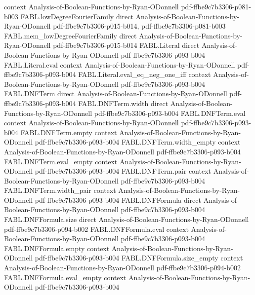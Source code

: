 \begin{theorem}
  {context}
  {Analysis-of-Boolean-Functions-by-Ryan-ODonnell}
  {pdf-ffbe9c7b3306-p081-b003}
\proofstep
  {FABL.lowDegreeFourierFamily}
  {direct}
  {Analysis-of-Boolean-Functions-by-Ryan-ODonnell}
  {pdf-ffbe9c7b3306-p015-b014,
    pdf-ffbe9c7b3306-p081-b003}
\proofstep
  {FABL.mem_lowDegreeFourierFamily}
  {direct}
  {Analysis-of-Boolean-Functions-by-Ryan-ODonnell}
  {pdf-ffbe9c7b3306-p015-b014}
\proofstep
  {FABL.Literal}
  {direct}
  {Analysis-of-Boolean-Functions-by-Ryan-ODonnell}
  {pdf-ffbe9c7b3306-p093-b004}
\proofstep
  {FABL.Literal.eval}
  {context}
  {Analysis-of-Boolean-Functions-by-Ryan-ODonnell}
  {pdf-ffbe9c7b3306-p093-b004}
\proofstep
  {FABL.Literal.eval_eq_neg_one_iff}
  {context}
  {Analysis-of-Boolean-Functions-by-Ryan-ODonnell}
  {pdf-ffbe9c7b3306-p093-b004}
\proofstep
  {FABL.DNFTerm}
  {direct}
  {Analysis-of-Boolean-Functions-by-Ryan-ODonnell}
  {pdf-ffbe9c7b3306-p093-b004}
\proofstep
  {FABL.DNFTerm.width}
  {direct}
  {Analysis-of-Boolean-Functions-by-Ryan-ODonnell}
  {pdf-ffbe9c7b3306-p093-b004}
\proofstep
  {FABL.DNFTerm.eval}
  {context}
  {Analysis-of-Boolean-Functions-by-Ryan-ODonnell}
  {pdf-ffbe9c7b3306-p093-b004}
\proofstep
  {FABL.DNFTerm.empty}
  {context}
  {Analysis-of-Boolean-Functions-by-Ryan-ODonnell}
  {pdf-ffbe9c7b3306-p093-b004}
\proofstep
  {FABL.DNFTerm.width_empty}
  {context}
  {Analysis-of-Boolean-Functions-by-Ryan-ODonnell}
  {pdf-ffbe9c7b3306-p093-b004}
\proofstep
  {FABL.DNFTerm.eval_empty}
  {context}
  {Analysis-of-Boolean-Functions-by-Ryan-ODonnell}
  {pdf-ffbe9c7b3306-p093-b004}
\proofstep
  {FABL.DNFTerm.pair}
  {context}
  {Analysis-of-Boolean-Functions-by-Ryan-ODonnell}
  {pdf-ffbe9c7b3306-p093-b004}
\proofstep
  {FABL.DNFTerm.width_pair}
  {context}
  {Analysis-of-Boolean-Functions-by-Ryan-ODonnell}
  {pdf-ffbe9c7b3306-p093-b004}
\proofstep
  {FABL.DNFFormula}
  {direct}
  {Analysis-of-Boolean-Functions-by-Ryan-ODonnell}
  {pdf-ffbe9c7b3306-p093-b004}
\proofstep
  {FABL.DNFFormula.size}
  {direct}
  {Analysis-of-Boolean-Functions-by-Ryan-ODonnell}
  {pdf-ffbe9c7b3306-p094-b002}
\proofstep
  {FABL.DNFFormula.eval}
  {context}
  {Analysis-of-Boolean-Functions-by-Ryan-ODonnell}
  {pdf-ffbe9c7b3306-p093-b004}
\proofstep
  {FABL.DNFFormula.empty}
  {context}
  {Analysis-of-Boolean-Functions-by-Ryan-ODonnell}
  {pdf-ffbe9c7b3306-p093-b004}
\proofstep
  {FABL.DNFFormula.size_empty}
  {context}
  {Analysis-of-Boolean-Functions-by-Ryan-ODonnell}
  {pdf-ffbe9c7b3306-p094-b002}
\proofstep
  {FABL.DNFFormula.eval_empty}
  {context}
  {Analysis-of-Boolean-Functions-by-Ryan-ODonnell}
  {pdf-ffbe9c7b3306-p093-b004}

\end{theorem}
